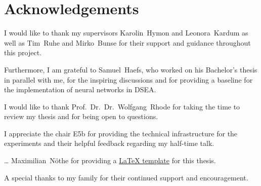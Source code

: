 \chapter*{Acknowledgements}

I would like to thank
my supervisors
  Karolin~Hymon and
  Leonora~Kardum
as well as
  Tim~Ruhe and
  Mirko~Bunse
for their support and guidance throughout this project.

Furthermore,
I am grateful to Samuel~Haefs,
  who worked on his Bachelor's thesis in parallel with me,
for the inspiring discussions
and for providing a baseline for the implementation of neural networks in DSEA.

I would like to thank Prof.~Dr.~Dr.~Wolfgang~Rhode for taking the time to
review my thesis
and for being open to questions.

I appreciate the chair E5b for providing the technical infrastructure for the experiments
and their helpful feedback regarding my half-time talk.

… Maximilian~Nöthe for providing a \href{https://github.com/maxnoe/tudothesis}{\LaTeX{} template} for this thesis.


A special thanks to my family for their continued support and encouragement.
